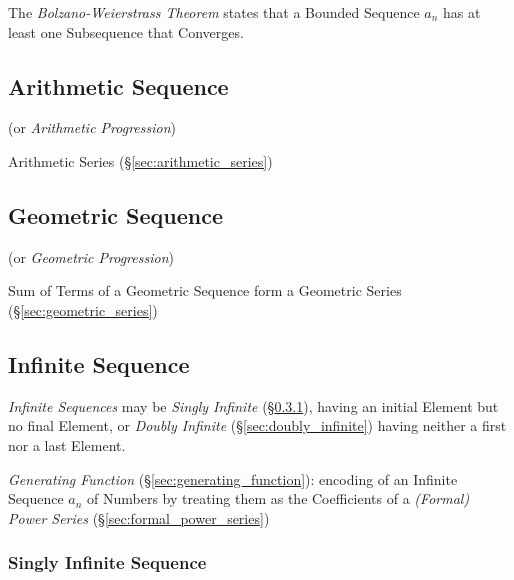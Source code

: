 The \emph{Bolzano-Weierstrass Theorem} states that a Bounded Sequence
$a_n$ has at least one Subsequence that Converges.



\subsection{Arithmetic Sequence}\label{sec:arithmetic_sequence}

(or \emph{Arithmetic Progression})

Arithmetic Series (\S\ref{sec:arithmetic_series})



\subsection{Geometric Sequence}\label{sec:geometric_sequence}

(or \emph{Geometric Progression})

Sum of Terms of a Geometric Sequence form a Geometric Series
(\S\ref{sec:geometric_series})



\subsection{Infinite Sequence}\label{sec:infinite_sequence}

\emph{Infinite Sequences} may be \emph{Singly Infinite}
(\S\ref{sec:singly_infinite}), having an initial Element but no final
Element, or \emph{Doubly Infinite} (\S\ref{sec:doubly_infinite})
having neither a first nor a last Element.

\fist \emph{Generating Function} (\S\ref{sec:generating_function}): encoding of
an Infinite Sequence $a_n$ of Numbers by treating them as the Coefficients of a
\emph{(Formal) Power Series} (\S\ref{sec:formal_power_series})



\subsubsection{Singly Infinite Sequence}\label{sec:singly_infinite}

